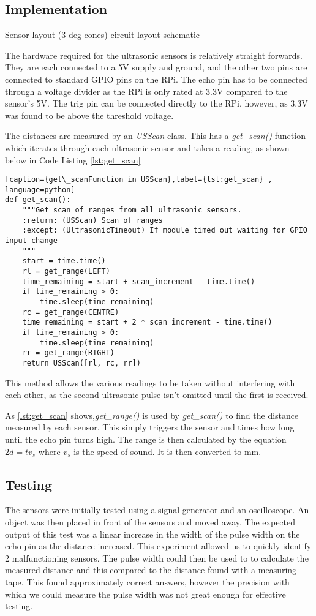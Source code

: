 \subsection{Implementation}\label{elec/range/impl}
Sensor layout (3 deg cones) 
circuit layout
schematic

The hardware required for the ultrasonic sensors is relatively straight forwards. They are each connected to a 5V supply and ground, and the other two pins are connected to standard GPIO pins on the RPi. The echo pin has to be connected through a voltage divider as the RPi is only rated at 3.3V compared to the sensor's 5V. The trig pin can be connected directly to the RPi, however, as 3.3V was found to be above the threshold voltage.

The distances are measured by an \textit{USScan} class. This has a \textit{get\_scan()} function which iterates through each ultrasonic sensor and takes a reading, as shown below in Code Listing \ref{lst:get_scan}

\begin{lstlisting}[caption={get\_scanFunction in USScan},label={lst:get_scan} , language=python]
def get_scan():
    """Get scan of ranges from all ultrasonic sensors.
    :return: (USScan) Scan of ranges
    :except: (UltrasonicTimeout) If module timed out waiting for GPIO input change
    """
    start = time.time()
    rl = get_range(LEFT)
    time_remaining = start + scan_increment - time.time()
    if time_remaining > 0:
        time.sleep(time_remaining)
    rc = get_range(CENTRE)
    time_remaining = start + 2 * scan_increment - time.time()
    if time_remaining > 0:
        time.sleep(time_remaining)
    rr = get_range(RIGHT)
    return USScan([rl, rc, rr])
\end{lstlisting}

This method allows the various readings to be taken without interfering with each other, as the second ultrasonic pulse isn't omitted until the first is received. 

As \ref{lst:get_scan} shows,\textit{get\_range()} is used by \textit{get\_scan()} to find the distance measured by each sensor. This simply triggers the sensor and times how long until the echo pin turns high. The range is then calculated by the equation $ 2d = tv_s$ where $v_s$ is the speed of sound. It is then converted to mm.

\subsection{Testing}\label{elec/range/test}
The sensors were initially tested using a signal generator and an 
oscilloscope. An object was then placed in front of the sensors 
and moved away. The expected output of this test was a linear increase
in the width of the pulse width on the echo pin as the distance increased.
This experiment allowed us to quickly identify 2 malfunctioning sensors. The pulse width could then be used to to calculate the measured distance
and this compared to the distance found with a measuring tape. This found 
approximately correct answers, however the precision with which we could 
measure the pulse width was not great enough for effective testing. 

